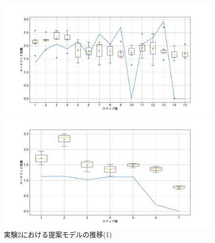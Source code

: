 \begin{figure}[h]
\begin{minipage}[b]{0.48\linewidth}
 \end{minipage}\\
 \begin{minipage}[b]{0.48\linewidth}
  \centering
  \includegraphics[scale=0.15]{./imgs/gaChange/sofa1_4.pdf}
 \end{minipage}
 \begin{minipage}[b]{0.48\linewidth}
  \centering
  \includegraphics[scale=0.15]{./imgs/gaChange/sofa2_4.pdf}
 \end{minipage}
 \caption{実験2における提案モデルの推移(1)}\label{fig:gaChange2_1}
\end{figure}

